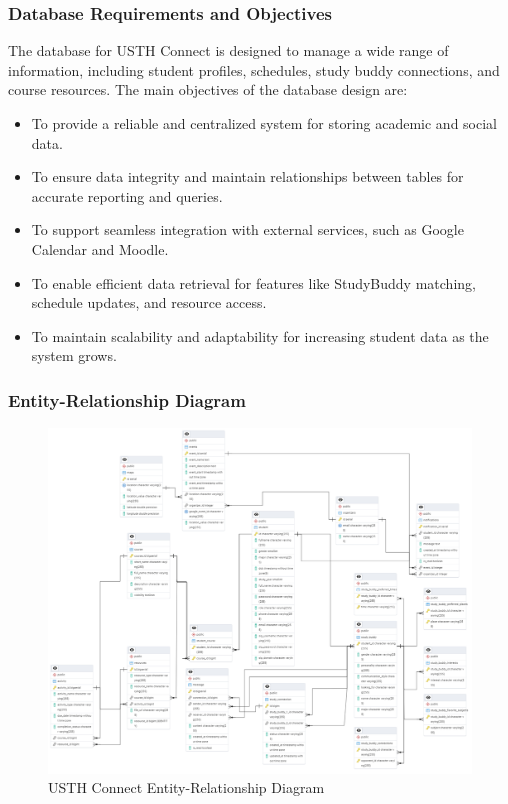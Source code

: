 \documentclass{article}
\begin{document}
\subsubsection{Database Requirements and Objectives}  
The database for USTH Connect is designed to manage a wide range of information, including student profiles, schedules, study buddy connections, and course resources. The main objectives of the database design are:  
\begin{itemize}  
    \item To provide a reliable and centralized system for storing academic and social data.  
    \item To ensure data integrity and maintain relationships between tables for accurate reporting and queries.  
    \item To support seamless integration with external services, such as Google Calendar and Moodle.  
    \item To enable efficient data retrieval for features like StudyBuddy matching, schedule updates, and resource access.  
    \item To maintain scalability and adaptability for increasing student data as the system grows.  
\end{itemize} 

\subsubsection{Entity-Relationship Diagram}
\begin{figure}[H]
    \centering
    \includegraphics[width=1\textwidth]{image/USTH-Connect-Database-Schema-Light.pdf} 
    \caption{USTH Connect Entity-Relationship Diagram}
\end{figure}
\end{document}
